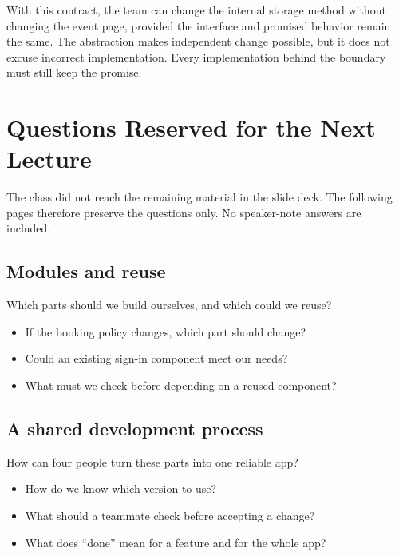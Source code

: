 \documentclass[11pt]{article}
\begin{document}
With this contract, the team can change the internal storage method without changing the event page, provided the interface and promised behavior remain the same. The abstraction makes independent change possible, but it does not excuse incorrect implementation. Every implementation behind the boundary must still keep the promise.

\section{Questions Reserved for the Next Lecture}

The class did not reach the remaining material in the slide deck. The following pages therefore preserve the questions only. No speaker-note answers are included.

\subsection{Modules and reuse}
\begin{uncovered}
Which parts should we build ourselves, and which could we reuse?
\end{uncovered}
\begin{uncovered}
\begin{itemize}
  \item If the booking policy changes, which part should change?
  \item Could an existing sign-in component meet our needs?
  \item What must we check before depending on a reused component?
\end{itemize}
\end{uncovered}

\subsection{A shared development process}
\begin{uncovered}
How can four people turn these parts into one reliable app?
\end{uncovered}
\begin{uncovered}
\begin{itemize}
  \item How do we know which version to use?
  \item What should a teammate check before accepting a change?
  \item What does ``done'' mean for a feature and for the whole app?
\end{itemize}
\end{uncovered}
\end{document}
